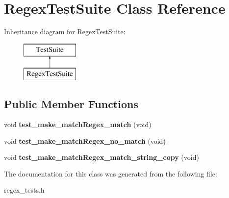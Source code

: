 \hypertarget{class_regex_test_suite}{}\section{Regex\+Test\+Suite Class Reference}
\label{class_regex_test_suite}
Inheritance diagram for Regex\+Test\+Suite\+:\begin{figure}[H]
\begin{center}
\leavevmode
\includegraphics[height=2.000000cm]{class_regex_test_suite}
\end{center}
\end{figure}
\subsection*{Public Member Functions}
\begin{DoxyCompactItemize}
\item 
\hypertarget{class_regex_test_suite_aac0838d917fd9fd6cc71ee086c644555}{}void {\bfseries test\+\_\+make\+\_\+match\+Regex\+\_\+match} (void)\label{class_regex_test_suite_aac0838d917fd9fd6cc71ee086c644555}

\item 
\hypertarget{class_regex_test_suite_ad9c02b9f4fd7feca750d476cda8e0c60}{}void {\bfseries test\+\_\+make\+\_\+match\+Regex\+\_\+no\+\_\+match} (void)\label{class_regex_test_suite_ad9c02b9f4fd7feca750d476cda8e0c60}

\item 
\hypertarget{class_regex_test_suite_a0f46b90e2c0a1c98750a3335d086979a}{}void {\bfseries test\+\_\+make\+\_\+match\+Regex\+\_\+match\+\_\+string\+\_\+copy} (void)\label{class_regex_test_suite_a0f46b90e2c0a1c98750a3335d086979a}

\end{DoxyCompactItemize}


The documentation for this class was generated from the following file\+:\begin{DoxyCompactItemize}
\item 
regex\+\_\+tests.\+h\end{DoxyCompactItemize}
